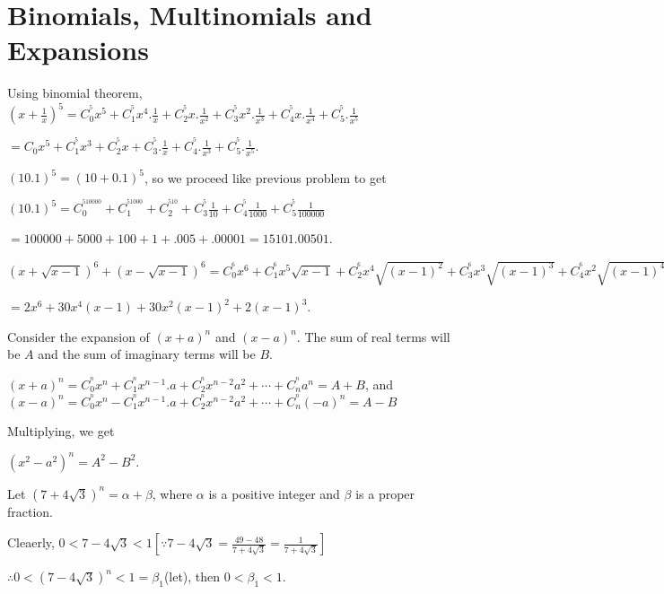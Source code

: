 \chapter{Binomials, Multinomials and Expansions}
\startitemize[n, 1*broad]
\item Using binomial theorem, $\left(x + \frac{1}{x}\right)^5 = C_0^^5x^5 + C_1^^5x^4.\frac{1}{x} +
  C_2^^5x.\frac{1}{x^2} + C_3^^5x^2.\frac{1}{x^3} + C_4^^5x.\frac{1}{x^4} + C_5^^5.\frac{1}{x^5}$

  $= C_0x^5 + C_1^^5x^3 + C_2^^5x + C_3^^5.\frac{1}{x} + C_4^^5.\frac{1}{x^3} + C_5^^5.\frac{1}{x^5}$.
\item $(10.1)^5 = (10 + 0.1)^5$, so we proceed like previous problem to get

  $(10.1)^5 = C_0^^510000 + C_1^^51000 + C_2^^510 + C_3^^5\frac{1}{10} + C_4^^5\frac{1}{1000} +
  C_5^^5\frac{1}{100000}$

  $= 100000 + 5000 + 100 + 1 + .005 + .00001 = 15101.00501$.
\item $(x + \sqrt{x - 1})^6 + (x - \sqrt{x - 1})^6 = C_0^^6x^6 + C_1^^6x^5\sqrt{x - 1} + C_2^^6x^4\sqrt{(x -
    1)^2} + C_3^^6x^3\sqrt{(x - 1)^3} + C_4^^6x^2\sqrt{(x - 1)^4} + C_5^^6x\sqrt{(x - 1)^5} + C_6^^6\sqrt{(x
    - 1)^6} + C_0^^6x^6 - C_1^^6x^5\sqrt{x - 1} + C_2^^6x^4\sqrt{(x - 1)^2} - C_3^^6x^3\sqrt{(x - 1)^3} +
  C_4^^6x^2\sqrt{(x - 1)^4} - C_5^^6x\sqrt{(x - 1)^5} + C_6^^6\sqrt{(x - 1)^6}$

  $= 2x^6 + 30x^4(x - 1) + 30x^2(x - 1)^2 + 2(x - 1)^3$.
\item Consider the expansion of $(x + a)^n$ and $(x - a)^n$. The sum of real terms will be $A$ and the sum
  of imaginary terms will be $B$.

  $(x + a)^n = C_0^^nx^n + C_1^^nx^{n - 1}.a + C_2^^nx^{n - 2}a^2 + \cdots + C_n^^na^n = A + B$, and
  $(x - a)^n = C_0^^nx^n - C_1^^nx^{n - 1}.a + C_2^^nx^{n - 2}a^2 + \cdots + C_n^^n(-a)^n = A - B$

  Multiplying, we get

  $(x^2 - a^2)^n = A^2 - B^2$.
\item Let $(7 + 4\sqrt{3})^n = \alpha + \beta$, where $\alpha$ is a positive integer and $\beta$ is a proper
  fraction.

  Cleaerly, $0 < 7 - 4\sqrt{3} < 1\left[\because 7 - 4\sqrt{3} = \frac{49 - 48}{7 + 4\sqrt{3}} = \frac{1}{7
      + 4\sqrt{3}}\right]$

  $\therefore 0 < (7 - 4\sqrt{3})^n < 1 = \beta_1$(let), then $0 < \beta_1 < 1$.


